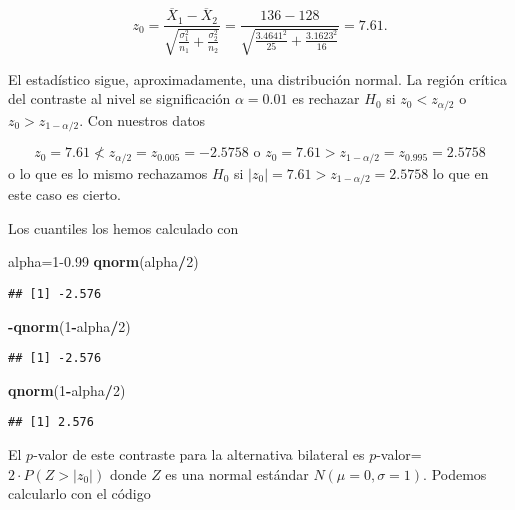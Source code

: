 \documentclass[
]{article}
\newenvironment{Shaded}{\begin{snugshade}}{\end{snugshade}}
\newcommand{\DecValTok}[1]{\textcolor[rgb]{0.00,0.00,0.81}{#1}}
\newcommand{\FloatTok}[1]{\textcolor[rgb]{0.00,0.00,0.81}{#1}}
\newcommand{\KeywordTok}[1]{\textcolor[rgb]{0.13,0.29,0.53}{\textbf{#1}}}
\newcommand{\NormalTok}[1]{#1}
\newcommand{\OperatorTok}[1]{\textcolor[rgb]{0.81,0.36,0.00}{\textbf{#1}}}
\begin{document}
\[z_0=\dfrac{\overline{X}_1-\overline{X}_2}{\sqrt{\frac{\sigma_1^2}{n_1}+\frac{\sigma_2^2}{n_2}}}=\frac{136-128}{\sqrt{\frac{3.4641^2}{25}+\frac{3.1623^2}{16}}}=7.61.\]

El estadístico sigue, aproximadamente, una distribución normal. La
región crítica del contraste al nivel se significación \(\alpha=0.01\)
es rechazar \(H_0\) si \(z_0<z_{\alpha/2}\) o \(z_0>z_{1-\alpha/2}\).
Con nuestros datos

\[z_0=7.61\not< z_{\alpha/2}=z_{0.005}=-2.5758 \mbox{ o } z_0=7.61  > z_{1-\alpha/2}=
z_{0.995}=2.5758\] o lo que es lo mismo rechazamos \(H_0\) si
\(|z_0|=7.61> z_{1-\alpha/2}=2.5758\) lo que en este caso es cierto.

Los cuantiles los hemos calculado con

\begin{Shaded}
\begin{Highlighting}[]
\NormalTok{alpha=}\DecValTok{1}\FloatTok{{-}0.99}
\KeywordTok{qnorm}\NormalTok{(alpha}\OperatorTok{/}\DecValTok{2}\NormalTok{)}
\end{Highlighting}
\end{Shaded}

\begin{verbatim}
## [1] -2.576
\end{verbatim}

\begin{Shaded}
\begin{Highlighting}[]
\OperatorTok{{-}}\KeywordTok{qnorm}\NormalTok{(}\DecValTok{1}\OperatorTok{{-}}\NormalTok{alpha}\OperatorTok{/}\DecValTok{2}\NormalTok{)}
\end{Highlighting}
\end{Shaded}

\begin{verbatim}
## [1] -2.576
\end{verbatim}

\begin{Shaded}
\begin{Highlighting}[]
\KeywordTok{qnorm}\NormalTok{(}\DecValTok{1}\OperatorTok{{-}}\NormalTok{alpha}\OperatorTok{/}\DecValTok{2}\NormalTok{)}
\end{Highlighting}
\end{Shaded}

\begin{verbatim}
## [1] 2.576
\end{verbatim}

El \(p\)-valor de este contraste para la alternativa bilateral es
\(p\)-valor=\(2\cdot P(Z>|z_0|)\) donde \(Z\) es una normal estándar
\(N(\mu=0,\sigma=1)\). Podemos calcularlo con el código
\end{document}
